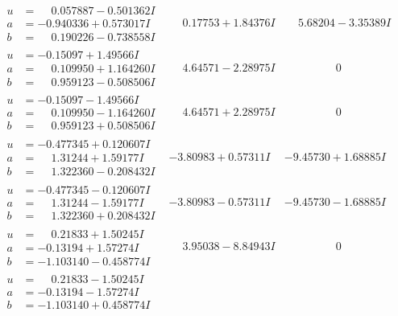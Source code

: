 \documentclass[1p]{elsarticle_modified}
\theoremstyle{definition}
\begin{document}
$$\begin{array}{c|c|c}
\begin{aligned}
u &= \phantom{-}0.057887 - 0.501362 I \\
a &= -0.940336 + 0.573017 I \\
b &= \phantom{-}0.190226 - 0.738558 I\end{aligned}
 & \phantom{-}0.17753 + 1.84376 I & \phantom{-}5.68204 - 3.35389 I \\ \hline\begin{aligned}
u &= -0.15097 + 1.49566 I \\
a &= \phantom{-}0.109950 + 1.164260 I \\
b &= \phantom{-}0.959123 - 0.508506 I\end{aligned}
 & \phantom{-}4.64571 - 2.28975 I & \phantom{-0.000000 } 0 \\ \hline\begin{aligned}
u &= -0.15097 - 1.49566 I \\
a &= \phantom{-}0.109950 - 1.164260 I \\
b &= \phantom{-}0.959123 + 0.508506 I\end{aligned}
 & \phantom{-}4.64571 + 2.28975 I & \phantom{-0.000000 } 0 \\ \hline\begin{aligned}
u &= -0.477345 + 0.120607 I \\
a &= \phantom{-}1.31244 + 1.59177 I \\
b &= \phantom{-}1.322360 - 0.208432 I\end{aligned}
 & -3.80983 + 0.57311 I & -9.45730 + 1.68885 I \\ \hline\begin{aligned}
u &= -0.477345 - 0.120607 I \\
a &= \phantom{-}1.31244 - 1.59177 I \\
b &= \phantom{-}1.322360 + 0.208432 I\end{aligned}
 & -3.80983 - 0.57311 I & -9.45730 - 1.68885 I \\ \hline\begin{aligned}
u &= \phantom{-}0.21833 + 1.50245 I \\
a &= -0.13194 + 1.57274 I \\
b &= -1.103140 - 0.458774 I\end{aligned}
 & \phantom{-}3.95038 - 8.84943 I & \phantom{-0.000000 } 0 \\ \hline\begin{aligned}
u &= \phantom{-}0.21833 - 1.50245 I \\
a &= -0.13194 - 1.57274 I \\
b &= -1.103140 + 0.458774 I\end{aligned}

\end{array}$$
\end{document}
